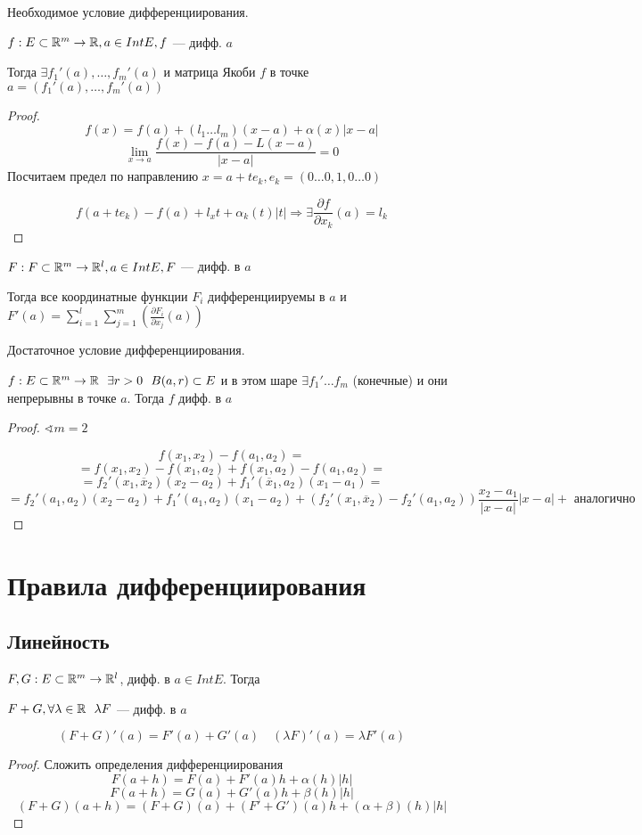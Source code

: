 \begin{theorem}
    Необходимое условие дифференциирования.

    $f:E\subset \mathbb{R}^m \to\mathbb{R}, a\in IntE, f$ --- дифф. $a$

    Тогда $\exists f_1'(a),\ldots,f_m'(a)$ и матрица Якоби $f$ в точке $a=(f_1'(a),\ldots,f_m'(a))$
\end{theorem}
\begin{proof}
    $$f(x)=f(a)+(l_1\ldots l_m)(x-a)+\alpha(x)|x-a|$$
    $$\lim_{x\to a} \frac{f(x)-f(a)-L(x-a)}{|x-a|}=0$$
    Посчитаем предел по направлению $x=a+te_k, e_k=(0\ldots 0,1,0\ldots 0)$

    $$f(a+te_k)-f(a)+l_xt+\alpha_k(t)|t| \Rightarrow \exists \frac{\partial f}{\partial x_k}(a)=l_k$$
\end{proof}

\begin{consequence}
    $F:F\subset \mathbb{R}^m \to\mathbb{R}^l, a\in IntE, F$ --- дифф. в $a$

    Тогда все координатные функции $F_i$ дифференциируемы в $a$ и $F'(a)=\sum_{i=1}^l \sum_{j=1}^m \left(\frac{\partial F_i}{\partial x_j}(a)\right)$
\end{consequence}

\begin{theorem}
    Достаточное условие дифференциирования.

    $f:E\subset \R^m \to\R \ \ \exists r>0 \ \ B(a,r)\subset E$ и в этом шаре $\exists f_1'\ldots f_m$ (конечные) и они непрерывны в точке $a$. Тогда $f$ дифф. в $a$
\end{theorem}
\begin{proof}
    $\sphericalangle m=2$

    $$f(x_1,x_2)-f(a_1,a_2)=$$
    $$=f(x_1,x_2)-f(x_1,a_2)+f(x_1, a_2)-f(a_1,a_2)=$$
    $$=f_2'(x_1, \overline x_2)(x_2-a_2)+f_1'(\overline x_1, a_2)(x_1-a_1)=$$
    $$=f_2'(a_1,a_2)(x_2-a_2)+f_1'(a_1, a_2)(x_1-a_2)+(f_2'(x_1, \overline x_2)-f_2'(a_1, a_2)) \frac{x_2-a_1}{|x-a|}|x-a|+\text{ аналогично}$$
\end{proof}

\section*{Правила дифференциирования}

\subsection{Линейность}

$F, G :E\subset \mathbb{R}^m\to\mathbb{R}^l$, дифф. в $a\in IntE$. Тогда

$F+G, \forall \lambda\in\mathbb{R} \ \ \lambda F$ --- дифф. в $a$

$$(F+G)'(a)=F'(a)+G'(a) \quad (\lambda F)'(a)=\lambda F'(a)$$

\begin{proof}
    Сложить определения дифференциирования
    $$F(a+h)=F(a)+F'(a)h + \alpha(h)|h|$$
    $$F(a+h)=G(a)+G'(a)h + \beta(h)|h|$$
    $$(F+G)(a+h)=(F+G)(a)+(F'+G')(a)h + (\alpha+\beta)(h)|h|$$
\end{proof}

